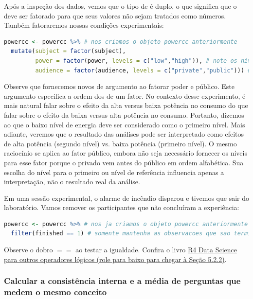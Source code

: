 \documentclass{article}
\begin{document}
Após a inspeção dos dados, vemos que o tipo de  é duplo, o que significa que o  deve ser fatorado para que seus valores não sejam tratados como números. Também fatoraremos nossas condições experimentais:

\begin{lstlisting}[language=R]
powercc <- powercc %>% # nos criamos o objeto powercc anteriormente 
  mutate(subject = factor(subject),
         power = factor(power, levels = c("low","high")), # note os niveis dos argumentos
         audience = factor(audience, levels = c("private","public"))) # note os niveis dos argumentos
\end{lstlisting}

Observe que fornecemos novos  de argumento ao fatorar poder e público. Este argumento especifica a ordem dos  de um fator. No contexto desse experimento, é mais natural falar sobre o efeito da alta versus baixa potência no consumo do que falar sobre o efeito da baixa versus alta potência no consumo. Portanto, dizemos ao \faRProject que o baixo nível de energia deve ser considerado como o primeiro nível. Mais adiante, veremos que o resultado das análises pode ser interpretado como efeitos de alta potência (segundo nível) vs. baixa potência (primeiro nível). O mesmo raciocínio se aplica ao fator público, embora não seja necessário fornecer os níveis para esse fator porque o privado vem antes do público em ordem alfabética. Sua escolha do nível para o primeiro ou nível de referência influencia apenas a interpretação, não o resultado real da análise.

Em uma sessão experimental, o alarme de incêndio disparou e tivemos que sair do laboratório. Vamos remover os participantes que não concluíram a experiência:

\begin{lstlisting}[language=R]
powercc <- powercc %>% # nos ja criamos o objeto powercc anteriormente
  filter(finished == 1) # somente mantenha as observacoes que sao terminadas ou iguais a 1
\end{lstlisting}

Observe o dobro $==$ ao testar a igualdade. Confira o livro \href{https://r4ds.had.co.nz/transform.html#filter-rows-with-filter}{R4 Data Science para outros operadores lógicos (role para baixo para chegar à Seção 5.2.2)}.


\subsubsection{Calcular a consistência interna e a média de perguntas que medem o mesmo conceito}
\end{document}
